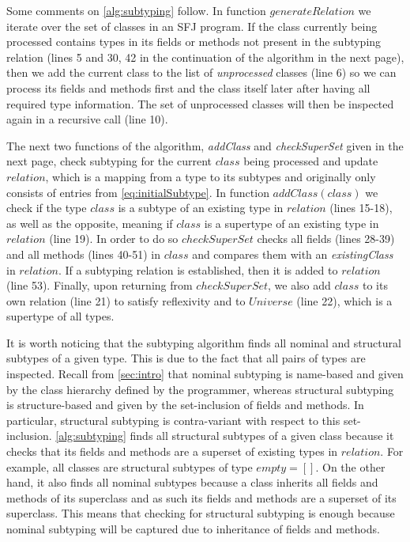 \documentclass[runningheads]{llncs}
\begin{document}
Some comments on \autoref{alg:subtyping} follow.
In function $generateRelation$ we iterate over the set of classes in an SFJ program.
If the class currently being processed contains types in its fields or methods not present in the subtyping relation (lines 5 and 30, 42 in the continuation of the algorithm in the next page), then we add the current class to the list of \emph{unprocessed} classes (line 6) so we can process its fields and methods first and the class itself later after having all required type information.
The set of unprocessed classes will then be inspected again in a recursive call (line 10).

The next two functions of the algorithm, \emph{addClass} and \emph{checkSuperSet} given in the next page, check subtyping for the current $class$ being processed and update $relation$, which is a mapping from a type to its subtypes and originally only consists of entries from \autoref{eq:initialSubtype}.
In function $addClass(class)$ we check if the type $class$ is a subtype of an existing type in $relation$ (lines 15-18), as well as the opposite, meaning if $class$ is a supertype of an existing type in $relation$ (line 19).
In order to do so $checkSuperSet$ checks all fields (lines 28-39) and all methods (lines 40-51) in $class$ and compares them with an \emph{existingClass} in $relation$.
If a subtyping relation is established, then it is added to $relation$ (line 53).
Finally, upon returning from $checkSuperSet$, we also add $class$ to its own relation (line 21) to satisfy reflexivity and to $Universe$ (line 22), which is a supertype of all types.

It is worth noticing that the subtyping algorithm finds all nominal and structural subtypes of a given type. This is due to the fact that all pairs of types are inspected.
Recall from \autoref{sec:intro} that nominal subtyping is name-based and given by the class hierarchy defined by the programmer, whereas structural subtyping is structure-based and given by the set-inclusion of fields and methods. In particular, structural subtyping is contra-variant with respect to this set-inclusion.
\autoref{alg:subtyping} finds all structural subtypes of a given class because it checks that its fields and methods are a superset of existing types in $relation$. For example, all classes are structural subtypes of type $empty = []$.
On the other hand, it also finds all nominal subtypes because a class inherits all fields and methods of its superclass and as such its fields and methods are a superset of its superclass.
This means that checking for structural subtyping is enough because nominal subtyping will be captured due to inheritance of fields and methods.
\end{document}
